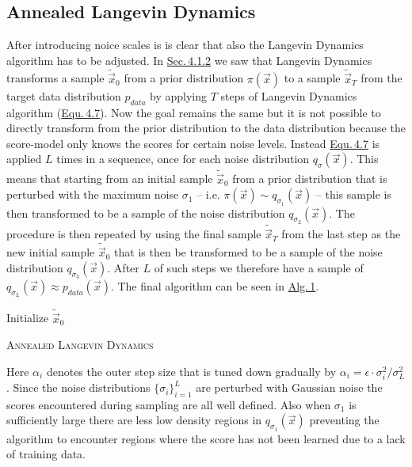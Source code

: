 \subsection{Annealed Langevin Dynamics} \label{4.3.2}
After introducing noice scales is is clear that also the Langevin Dynamics algorithm has to be adjusted. In \hyperref[sec:4.1.2]{Sec.\,4.1.2} we saw that Langevin Dynamics transforms a sample $\tilde{\vec{x}}_0$ from a prior distribution $\pi(\vec{x})$ to a sample $\tilde{\vec{x}}_T$ from the target data distribution $p_{data}$ by applying $T$ steps of Langevin Dynamics algorithm (\hyperref[equ:4.7]{Equ.\,4.7}). Now the goal remains the same but it is not possible to directly transform from the prior distribution to the data distribution because the score-model only knows the scores for certain noise levels. Instead \hyperref[equ:4.7]{Equ.\,4.7} is applied $L$ times in a sequence, once for each noise distribution $q_\sigma(\vec{x})$. This means that starting from an initial sample $\tilde{\vec{x}}_0$ from a prior distribution that is perturbed with the maximum noise $\sigma_1$ – i.e. $\pi(\vec{x})\sim q_{\sigma_1}(\vec{x})$ – this sample is then transformed to be a sample of the noise distribution $q_{\sigma_{2}}(\vec{x})$. The procedure is then repeated by using the final sample $\tilde{\vec{x}}_T$ from the last step as the new initial sample $\tilde{\vec{x}}_0$ that is then be transformed to be a sample of the noise distribution $q_{\sigma_{3}}(\vec{x})$. After $L$ of such steps we therefore have a sample of $q_{\sigma_L}(\vec{x})\approx p_{data}(\vec{x})$. The final algorithm can be seen in \hyperref[alg:1]{Alg.\,1}.
%
\begin{algorithm} \label{alg:1}
    \DontPrintSemicolon
    Initialize $\tilde{\vec{x}}_0$\;
    \caption{\textsc{Annealed Langevin Dynamics}}
\end{algorithm}
%
Here $\alpha_i$ denotes the outer step size that is tuned down gradually by $\alpha_i=\epsilon\cdot\sigma_i^2/\sigma_L^2$. Since the noise distributions $\{\sigma_i\}_{i=1}^L$ are perturbed with Gaussian noise the scores encountered during sampling are all well defined. Also when $\sigma_1$ is sufficiently large there are less low density regions in $q_{\sigma_1}(\vec{x})$ preventing the algorithm to encounter regions where the score has not been learned due to a lack of training data.

